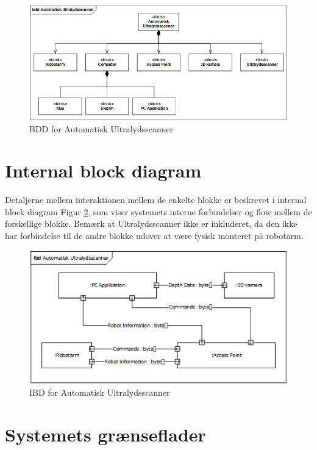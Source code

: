 \begin{figure}[H]
    \centering
    \includegraphics[width=1\textwidth]{figurer/d/Design/BDD}
    \caption{BDD for Automatisk Ultralydsscanner}
    \label{BDD}
\end{figure}

\section{Internal block diagram}
Detaljerne mellem interaktionen mellem de enkelte blokke er beskrevet i internal block diagram Figur \ref{IBD}, som viser systemets interne forbindelser og flow mellem de forskellige blokke. Bemærk at Ultralydsscanner ikke er inkluderet, da den ikke har forbindelse til de andre blokke udover at være fysisk monteret på robotarm. 

\begin{figure}[H]
    \centering
    \includegraphics[width=1\textwidth]{figurer/d/Design/IBD}
    \caption{IBD for Automatisk Ultralydsscanner}
    \label{IBD}
\end{figure}

\section{Systemets grænseflader}